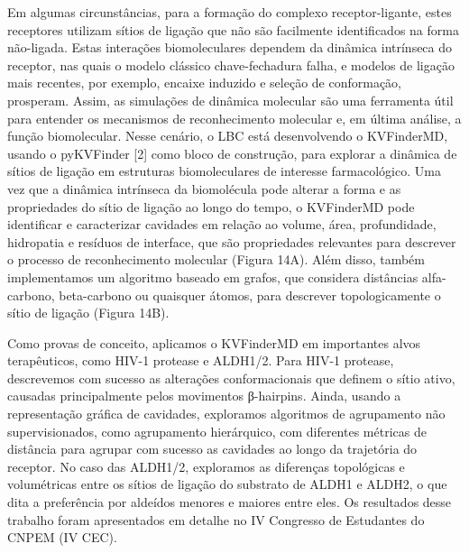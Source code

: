 \documentclass[Portugues]{phdquali}
\begin{document}

Em algumas circunstâncias, para a formação do complexo receptor-ligante, estes receptores utilizam sítios de ligação que não são facilmente identificados na forma não-ligada. Estas interações biomoleculares dependem da dinâmica intrínseca do receptor, nas quais o modelo clássico chave-fechadura falha, e modelos de ligação mais recentes, por exemplo, encaixe induzido e seleção de conformação, prosperam. Assim, as simulações de dinâmica molecular são uma ferramenta útil para entender os mecanismos de reconhecimento molecular e, em última análise, a função biomolecular. Nesse cenário, o LBC está desenvolvendo o KVFinderMD, usando o pyKVFinder [2] como bloco de construção, para explorar a dinâmica de sítios de ligação em estruturas biomoleculares de interesse farmacológico. Uma vez que a dinâmica intrínseca da biomolécula pode alterar a forma e as propriedades do sítio de ligação ao longo do tempo, o KVFinderMD pode identificar e caracterizar cavidades em relação ao volume, área, profundidade, hidropatia e resíduos de interface, que são propriedades relevantes para descrever o processo de reconhecimento molecular (Figura 14A). Além disso, também implementamos um algoritmo baseado em grafos, que considera distâncias alfa-carbono, beta-carbono ou quaisquer átomos, para descrever topologicamente o sítio de ligação (Figura 14B).

Como provas de conceito, aplicamos o KVFinderMD em importantes alvos terapêuticos, como HIV-1 protease e ALDH1/2. Para HIV-1 protease, descrevemos com sucesso as alterações conformacionais que definem o sítio ativo, causadas principalmente pelos movimentos β-hairpins. Ainda, usando a representação gráfica de cavidades, exploramos algoritmos de agrupamento não supervisionados, como agrupamento hierárquico, com diferentes métricas de distância para agrupar com sucesso as cavidades ao longo da trajetória do receptor. No caso das ALDH1/2, exploramos as diferenças topológicas e volumétricas entre os sítios de ligação do substrato de ALDH1 e ALDH2, o que dita a preferência por aldeídos menores e maiores entre eles. Os resultados desse trabalho foram apresentados em detalhe no IV Congresso de Estudantes do CNPEM (IV CEC). 
\end{document}
